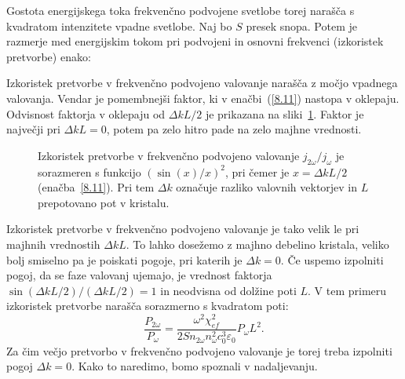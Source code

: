 Gostota energijskega toka frekvenčno podvojene svetlobe torej narašča s kvadratom
intenzitete vpadne svetlobe. Naj bo $S$ presek snopa. Potem je razmerje med 
energijskim tokom pri podvojeni in osnovni frekvenci (izkoristek pretvorbe) enako:

Izkoristek pretvorbe v frekvenčno podvojeno valovanje narašča z močjo vpadnega valovanja.
Vendar je pomembnejši faktor, ki v enačbi~(\ref{8.11}) nastopa v oklepaju.
Odvisnost faktorja v oklepaju od $\Delta kL/2$ je prikazana 
na sliki~\ref{fig:shg2}. Faktor je največji pri $\Delta kL = 0$, potem pa zelo hitro
pade na zelo majhne vrednosti. 

\begin{figure}[ht]
\centering
\def\svgwidth{85truemm} 

\caption{Izkoristek pretvorbe v frekvenčno podvojeno valovanje $j_{2\omega}/j_\omega$ je 
sorazmeren s funkcijo $(\sin(x)/x)^2$,
pri čemer je $x = \Delta k L/2$ (enačba~\ref{8.11}). 
Pri tem $\Delta k$ označuje razliko valovnih vektorjev in
$L$ prepotovano pot v kristalu.}
\label{fig:shg2}
\end{figure}
Izkoristek pretvorbe v frekvenčno podvojeno valovanje je tako velik le pri  majhnih vred\-no\-stih 
$\Delta kL$. To lahko dosežemo z majhno debelino kristala, veliko bolj smiselno
pa je poiskati pogoje, pri katerih je $\Delta k = 0$. Če uspemo izpolniti pogoj, da
se faze valovanj ujemajo, je vrednost faktorja 
$\sin(\Delta kL/2)/(\Delta kL/2)=1$ in neodvisna od dolžine poti $L$.
V tem primeru izkoristek pretvorbe narašča sorazmerno s kvadratom poti:
\begin{equation}
\frac{P_{2\omega}}{P_{\omega}}=
\frac{\omega^2 \chi_{ef}^2}{2 S n_{2\omega} n_\omega^2c_0^3\varepsilon_0} P_\omega L^2.
\label{eq:shgl2}
\end{equation}
Za čim večjo pretvorbo v frekvenčno podvojeno valovanje je torej treba 
izpolniti pogoj $\Delta k = 0$. Kako to naredimo,
bomo spoznali v nadaljevanju.


